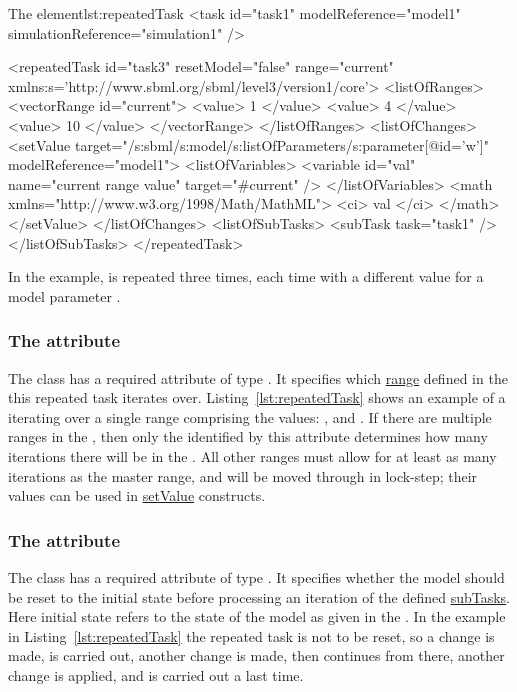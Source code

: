 
%
\begin{myXmlLst}{The  element}{lst:repeatedTask}
<task id="task1" modelReference="model1" simulationReference="simulation1" />

<repeatedTask id="task3" resetModel="false" range="current"
    xmlns:s='http://www.sbml.org/sbml/level3/version1/core'>
  <listOfRanges>
    <vectorRange id="current"> 
        <value> 1 </value> 
        <value> 4 </value> 
        <value> 10 </value> 
    </vectorRange> 
  </listOfRanges>
  <listOfChanges>
     <setValue target="/s:sbml/s:model/s:listOfParameters/s:parameter[@id='w']" modelReference="model1">
       <listOfVariables> 
         <variable id="val" name="current range value" target="#current" /> 
       </listOfVariables> 
       <math xmlns="http://www.w3.org/1998/Math/MathML"> 
         <ci> val </ci> 
       </math> 
     </setValue> 
  </listOfChanges>
  <listOfSubTasks>
    <subTask task="task1" />
  </listOfSubTasks>
</repeatedTask>
\end{myXmlLst}
%
In the example,  is repeated three times, each time with a different value for a model parameter . 


\subsubsection{The  attribute}
\label{sec:rangeAttribute}
The  class has a required attribute  of type .
It specifies which \hyperref[sec:ranges]{range} defined in the  this repeated task iterates over.
Listing~\ref{lst:repeatedTask} shows an example of a  iterating over a single range comprising the values: ,  and .
If there are multiple ranges in the , then only the  identified by this attribute determines how many iterations there will be in the .
All other ranges must allow for at least as many iterations as the master range, and will be moved through in lock-step; their values can be used in \hyperref[class:setValue]{setValue} constructs.


\subsubsection{The  attribute}
\label{sec:resetModel}
The  class has a required attribute  of type . It specifies whether the model should be reset to the initial state before processing an iteration of the defined \hyperref[class:subTask]{subTasks}. Here initial state refers to the state of the model as given in the .  In the example in  Listing~\ref{lst:repeatedTask} the repeated task is not to be reset, so a change is made,  is carried out, another change is made, then  continues from there, another change is applied, and  is carried out a last time.



